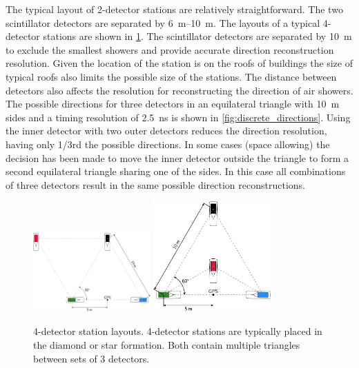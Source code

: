 The typical layout of 2-detector stations are relatively straightforward. The two scintillator detectors are separated by \SIrange{6}{10}{\meter}. The layouts of a typical 4-detector stations are shown in \cref{fig:4_detector_layouts}. The scintillator detectors are separated by \SI{10}{\meter} to exclude the smallest showers and provide accurate direction reconstruction resolution. Given the location of the station is on the roofs of buildings the size of typical roofs also limits the possible size of the stations. The distance between detectors also affects the resolution for reconstructing the direction of air showers. The possible directions for three detectors in an equilateral triangle with \SI{10}{\meter} sides and a timing resolution of \SI{2.5}{\ns} is shown in \cref{fig:discrete_directions}. Using the inner detector with two outer detectors reduces the direction resolution, having only 1/3rd the possible directions. In some cases (space allowing) the decision has been made to move the inner detector outside the triangle to form a second equilateral triangle sharing one of the sides. In this case all combinations of three detectors result in the same possible direction reconstructions.

\begin{figure}
    \centering
    \includegraphics[width=0.4\textwidth]
                    {plots/station/4_detector_diamond}
    \includegraphics[width=0.4\textwidth]
                    {plots/station/4_detector_star}
    \caption{4-detector station layouts. 4-detector stations are typically placed in the diamond or star formation. Both contain multiple triangles between sets of 3 detectors.}
    \label{fig:4_detector_layouts}
\end{figure}

